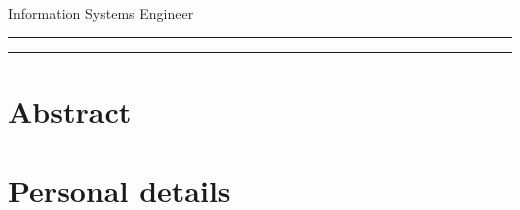 \documentclass[10pt,a4paper]{article}
\begin{document}
\thispagestyle{empty}

\begin{flushright}
    \huge{\textbf{\name}} \\
    \large{Information Systems Engineer}
\end{flushright}
\hrule
\bigskip



\bigskip
\hrule

\bigskip

\section*{Abstract}


\section*{Personal details}

\end{document}
